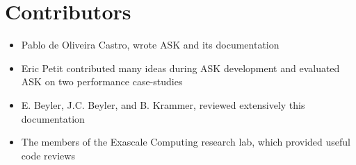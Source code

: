 \documentclass[a4]{report}
\begin{document}
\section*{Contributors}
\begin{itemize}
	\item Pablo de Oliveira Castro, wrote ASK and its documentation
	\item Eric Petit contributed many ideas during ASK development and evaluated ASK on two performance case-studies
	\item E. Beyler, J.C. Beyler, and B. Krammer, reviewed extensively this documentation 
	\item The members of the Exascale Computing research lab, which provided useful code reviews
\end{itemize}








\end{document}
